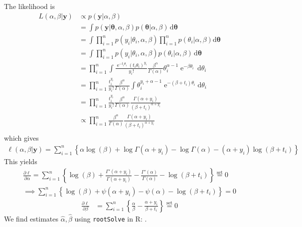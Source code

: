 \documentclass[11pt]{article}
\newcommand*\pd{\partial}
\newcommand*\ba{\[ \begin{aligned}}
\newcommand*\ea{\end{aligned} \]}
\newcommand*\estim[1]{\widehat{#1}}
\newcommand*\der{\text{d}}
\newcommand*\pderiv[2]{\frac{\pd #1}{\pd #2}}
\newcommand*\by{\mathbf{y}}
\newcommand*\btheta{\boldsymbol{\theta}}
\newcommand\e{\operatorname{e}}
\renewcommand\;{\,}
\begin{document}
\section{}
The likelihood is
\ba
L(\alpha, \beta | \by) 
	& \propto p(\by | \alpha, \beta) \\
	& = \int p(\by | \btheta, \alpha, \beta) p(\btheta | \alpha, \beta)
		 \; \der \btheta \\
	& = \int \prod_{i=1}^n p(y_i | \theta_i, \alpha, \beta)
		\prod_{i=1}^n p(\theta_i | \alpha, \beta) \der \btheta \\
	& = \int \prod_{i=1}^n p(y_i | \theta_i, \alpha, \beta)
		p(\theta_i | \alpha, \beta) \; \der \btheta \\
	& = \prod_{i=1}^n \int 
		\frac{ \e^{-t_i \theta_i} (t_i \theta_i)^{y_i} }{y_i!}
		\frac{\beta^\alpha}{\Gamma(\alpha)} \theta_i^{\alpha - 1}
		\e^{- \beta \theta_i } \; \der \theta_i \\
	& = \prod_{i=1}^n \frac{t_i^{y_i}}{y_i!}
		\frac{\beta^\alpha}{\Gamma(\alpha)} \int
		\theta_i^{y_i + \alpha - 1}
		\e^{-(\beta + t_i) \theta_i}
		\der \theta_i \\
	& = \prod_{i=1}^n \frac{t_i^{y_i}}{y_i!}
		\frac{\beta^\alpha}{\Gamma(\alpha)}
		\frac{\Gamma(\alpha + y_i)}{(\beta + t_i)^{\alpha + y_i}} \\
	& \propto
		\prod_{i=1}^n 
		\frac{\beta^\alpha}{\Gamma(\alpha)}
		\frac{\Gamma(\alpha + y_i)}{(\beta + t_i)^{\alpha + y_i}} \\
\ea
which gives
\ba
\ell(\alpha, \beta | \by)
	= \sum_{i=1}^n \left\{
		\alpha \log(\beta) + \log \Gamma(\alpha + y_i)
		- \log \Gamma(\alpha) 
		- (\alpha + y_i) \log(\beta + t_i)
		\right\}
\ea
This yields
\ba
\pderiv{\ell}{\alpha}
	 = \sum_{i=1}^n \left\{
		\log(\beta) + \frac{\Gamma'(\alpha + y_i)}{\Gamma(\alpha + y_i)}
		- \frac{\Gamma'(\alpha)}{\Gamma(\alpha)}
		- \log(\beta + t_i) \right\}
	 \overset{\text{set}}{=} 0 \\
	\implies
	\sum_{i=1}^n \left\{
		\log(\beta) +\psi(\alpha + y_i)
		- \psi(\alpha)
		- \log(\beta + t_i) \right\}
		= 0 
\ea
\ba
\pderiv{\ell}{\beta}
	& = \sum_{i=1}^n \left\{
		\frac{\alpha}{\beta} 
		- \frac{\alpha + y_i}{\beta + t_i}
		\right\}
	 \overset{\text{set}}{=} 0
\ea
We find estimates $\estim\alpha, \estim\beta$ using \texttt{rootSolve} in R:
.
\end{document}
